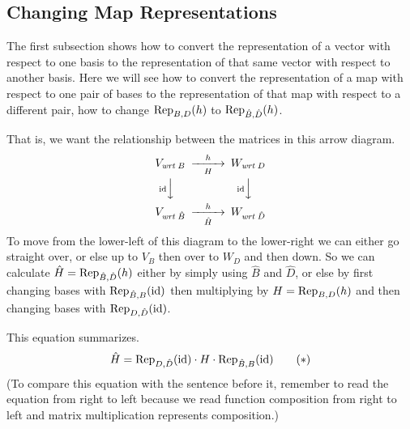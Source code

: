 \subsection{Changing Map Representations}
The first subsection shows how to convert the representation
of a vector with respect to one basis to the representation of that
same vector with respect to another basis.
Here we will see how to
convert the representation of a map  with
respect to one pair of bases  to the representation of that
map with respect to a different pair, how to change
$\rep{h}{B,D}$ to $\rep{h}{\hat{B},\hat{D}}$.

That is, we want the relationship between the matrices in this 
arrow diagram.
\begin{equation*}
  \begin{CD}
    V_\wrt{B}                   @>h>H>        W_\wrt{D}       \\
    @V{\scriptsize\identity} VV                @V\scriptsize\identity VV \\
    V_\wrt{\hat{B}}             @>h>\hat{H}>  W_\wrt{\hat{D}}
  \end{CD}
\end{equation*}
To move from the lower-left of this diagram 
to the lower-right we can either go straight over, or
else up to $V_B$ then over to $W_D$ and then down.
So 
we can calculate $\hat{H}=\rep{h}{\hat{B},\hat{D}}$ 
either by simply using $\hat{B}$ and $\hat{D}$,
or else by first changing bases with $\rep{\identity}{\hat{B},B}$ 
then multiplying by \( H=\rep{h}{B,D} \)
and then changing bases with $\rep{\identity}{D,\hat{D}}$.

This equation summarizes.
\begin{equation*}
   \hat{H}=
   \rep{\identity}{D,\hat{D}}\cdot H\cdot \rep{\identity}{\hat{B},B}
\tag*{\text{($*$})}\end{equation*}
(To compare this equation with the sentence before it, remember to read the
equation from right to left because we read
function composition from right to left and matrix multiplication 
represents composition.)

